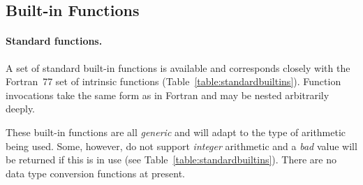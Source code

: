 \subsection{Built-in Functions}

\paragraph{Standard functions.}
A set of standard built-in functions is available and corresponds closely
with the Fortran~77 set of intrinsic functions
(Table~\ref{table:standardbuiltins}). 
Function invocations take the same form as in Fortran and may be nested
arbitrarily deeply. 

These built-in functions are all {\em generic} and will adapt to the type of
arithmetic being used. 
Some, however, do not support {\em integer} arithmetic and a {\em bad} value
will be returned if this is in use (see Table~\ref{table:standardbuiltins}). 
There are no data type conversion functions at present.

